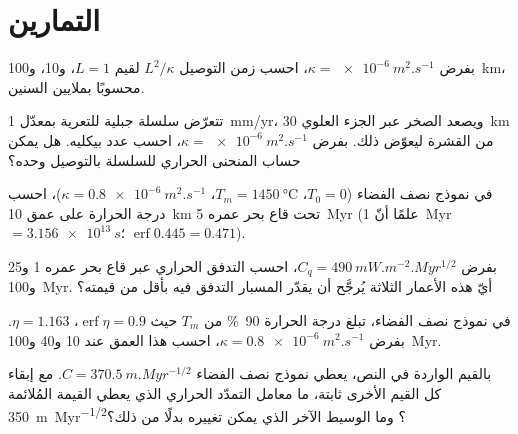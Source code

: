 \section{التمارين}

\begin{exercise}[$\star$]\label{exo:b3:lithosphere-thermal-models:1}
بفرض $\kappa = \qty{e-6}{m^2.s^{-1}}$، احسب زمن التوصيل $L^2/\kappa$
لقيم $L = 1$، و10، و\qty{100}{km}، محسوبًا بملايين السنين.
\end{exercise}

\begin{exercise}[$\star$]\label{exo:b3:lithosphere-thermal-models:2}
تتعرّض سلسلة جبلية للتعرية بمعدّل \qty{1}{mm/yr}، ويصعد الصخر عبر الجزء العلوي
\qty{30}{km} من القشرة ليعوّض ذلك. بفرض $\kappa = \qty{e-6}{m^2.s^{-1}}$،
احسب عدد بيكليه. هل يمكن حساب المنحنى الحراري للسلسلة بالتوصيل
وحده؟
\end{exercise}

\begin{exercise}[$\star$]\label{exo:b3:lithosphere-thermal-models:3}
في نموذج نصف الفضاء ($T_0 = 0$، $T_m = \qty{1450}{\celsius}$، $\kappa =
\qty{0.8e-6}{m^2.s^{-1}}$)، احسب درجة الحرارة على عمق \qty{10}{km} تحت
قاع بحر عمره \qty{5}{Myr} (علمًا أنّ \qty{1}{Myr} $= \qty{3.156e13}{s}$؛ $\operatorname{erf}
0.445 = 0.471$).
\end{exercise}

\begin{exercise}[$\star$]\label{exo:b3:lithosphere-thermal-models:4}
بفرض $C_q = \qty{490}{mW.m^{-2}.Myr^{1/2}}$، احسب التدفق الحراري عبر
قاع بحر عمره 1 و25 و\qty{100}{Myr}. أيّ هذه الأعمار الثلاثة يُرجَّح أن يقدّر
المسبار التدفق فيه بأقل من قيمته؟
\end{exercise}

\begin{exercise}[$\star\star$]\label{exo:b3:lithosphere-thermal-models:5}
في نموذج نصف الفضاء، تبلغ درجة الحرارة \qty{90}{\percent} من $T_m$
حيث $\operatorname{erf}\eta = 0.9$، $\eta = 1.163$. بفرض $\kappa =
\qty{0.8e-6}{m^2.s^{-1}}$، احسب هذا العمق عند 10 و40 و\qty{100}{Myr}.
\end{exercise}

\begin{exercise}[$\star\star$]\label{exo:b3:lithosphere-thermal-models:6}
بالقيم الواردة في النص، يعطي نموذج نصف الفضاء $C =
\qty{370.5}{m.Myr^{-1/2}}$. مع إبقاء كل القيم الأخرى ثابتة، ما معامل التمدّد الحراري
الذي يعطي القيمة المُلائمة \qty{350}{m.Myr^{-1/2}}؟ وما الوسيط الآخر
الذي يمكن تغييره بدلًا من ذلك؟
\end{exercise}

